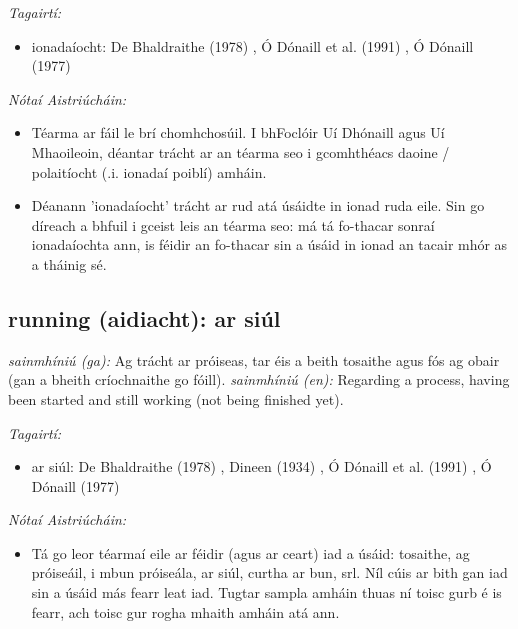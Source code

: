 \documentclass{article}
\begin{document}
 \noindent \textit{Tagairtí:}
\begin{itemize}
	\item ionadaíocht: De Bhaldraithe (1978) \cite{de-bhaldraithe}, Ó Dónaill et al. (1991) \cite{focloir-beag}, Ó Dónaill (1977) \cite{odonaill}
\end{itemize}

 \noindent \textit{Nótaí Aistriúcháin:}
\begin{itemize}
	\item Téarma ar fáil le brí chomhchosúil. I bhFoclóir Uí Dhónaill agus Uí Mhaoileoin, déantar trácht ar an téarma seo i gcomhthéacs daoine / polaitíocht (.i. ionadaí poiblí) amháin.
	\item Déanann 'ionadaíocht' trácht ar rud atá úsáidte in ionad ruda eile. Sin go díreach a bhfuil i gceist leis an téarma seo: má tá fo-thacar sonraí ionadaíochta ann, is féidir an fo-thacar sin a úsáid in ionad an tacair mhór as a tháinig sé.
\end{itemize}


\subsection*{running (aidiacht): ar siúl} 
 \noindent \textit{sainmhíniú (ga):} Ag trácht ar próiseas, tar éis a beith tosaithe agus fós ag obair (gan a bheith críochnaithe go fóill).
\newline\newline
 \noindent \textit{sainmhíniú (en):} Regarding a process, having been started and still working (not being finished yet).
\newline

 \noindent \textit{Tagairtí:}
\begin{itemize}
	\item ar siúl: De Bhaldraithe (1978) \cite{de-bhaldraithe}, Dineen (1934) \cite{dineen}, Ó Dónaill et al. (1991) \cite{focloir-beag}, Ó Dónaill (1977) \cite{odonaill}
\end{itemize}

 \noindent \textit{Nótaí Aistriúcháin:}
\begin{itemize}
	\item Tá go leor téarmaí eile ar féidir (agus ar ceart) iad a úsáid: tosaithe, ag próiseáil, i mbun próiseála, ar siúl, curtha ar bun, srl. Níl cúis ar bith gan iad sin a úsáid más fearr leat iad. Tugtar sampla amháin thuas ní toisc gurb é is fearr, ach toisc gur rogha mhaith amháin atá ann.
\end{itemize}
\end{document}
